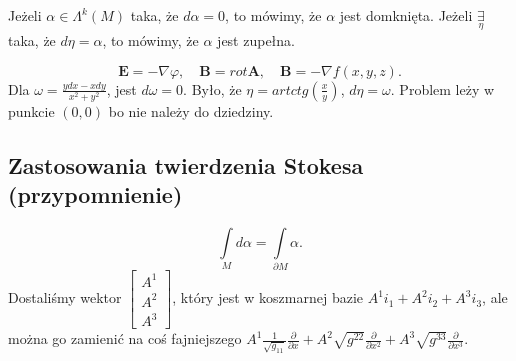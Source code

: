 \documentclass[../main.tex]{subfiles}
\begin{document}
    \begin{definicja}
        Jeżeli $\alpha\in\Lambda^k(M)$ taka, że $d\alpha = 0$, to mówimy, że $\alpha$ jest domknięta. Jeżeli $\underset{\eta}{\exists} $ taka, że $d\eta = \alpha$, to mówimy, że $\alpha$ jest zupełna.
    \end{definicja}
    \begin{przyklad}
        \[
            \mathbf{E} = -\nabla\varphi,\quad \mathbf{B} = rot \mathbf{A},\quad \mathbf{B} = -\nabla f(x,y,z).
        \]
        Dla $\omega = \frac{ydx - xdy}{x^2+y^2}$, jest $d\omega = 0$. Było, że $\eta = artctg(\frac{x}{y})$, $d\eta = \omega$. Problem leży w punkcie  $(0,0)$ bo nie należy do dziedziny.\\
    \end{przyklad}
    \subsection{Zastosowania twierdzenia Stokesa (przypomnienie)}
    \[
    \int\limits_Md\alpha = \int\limits_{\partial M}\alpha
    .\]
Dostaliśmy wektor $\begin{bmatrix} A^1\\A^2\\A^3 \end{bmatrix} $, który jest w koszmarnej bazie $A^1i_1 + A^2i_2 + A^3i_3$, ale można go zamienić na coś fajniejszego $A^1 \frac{1}{\sqrt{g_{11}} }\frac{\partial }{\partial x} + A^2\sqrt{g^{22}} \frac{\partial }{\partial x^2} + A^3 \sqrt{g^{33}}\frac{\partial }{\partial x^3}$.\\
\end{document}
